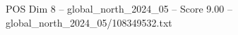 \begin{textsample}{POS Dim 8 – global\_north\_2024\_05 – Score 9.00 – global\_north\_2024\_05/108349532.txt}
\end{textsample}
